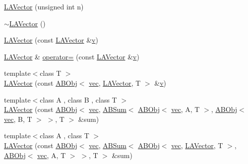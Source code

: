 \begin{DoxyCompactItemize}
\item 
\mbox{\hyperlink{classROOT_1_1Minuit2_1_1LAVector_a3dca313e27f716415056d248bd05cf1f}{L\+A\+Vector}} (unsigned int n)
\item 
\mbox{\hyperlink{classROOT_1_1Minuit2_1_1LAVector_a72c44338e1a37837e9546bfd674c22cb}{$\sim$\+L\+A\+Vector}} ()
\item 
\mbox{\hyperlink{classROOT_1_1Minuit2_1_1LAVector_ad568d638899b4fc3631c3d0a1d76f1cd}{L\+A\+Vector}} (const \mbox{\hyperlink{classROOT_1_1Minuit2_1_1LAVector}{L\+A\+Vector}} \&\mbox{\hyperlink{adat__devel_2lib_2hadron_2hadron__timeslice_8cc_a716fc87f5e814be3ceee2405ed6ff22a}{v}})
\item 
\mbox{\hyperlink{classROOT_1_1Minuit2_1_1LAVector}{L\+A\+Vector}} \& \mbox{\hyperlink{classROOT_1_1Minuit2_1_1LAVector_ad38b5ed9fc32389cb68034cde125b203}{operator=}} (const \mbox{\hyperlink{classROOT_1_1Minuit2_1_1LAVector}{L\+A\+Vector}} \&\mbox{\hyperlink{adat__devel_2lib_2hadron_2hadron__timeslice_8cc_a716fc87f5e814be3ceee2405ed6ff22a}{v}})
\item 
{\footnotesize template$<$class T $>$ }\\\mbox{\hyperlink{classROOT_1_1Minuit2_1_1LAVector_ac38d854f7a156fc61cabce29416f36cc}{L\+A\+Vector}} (const \mbox{\hyperlink{classROOT_1_1Minuit2_1_1ABObj}{A\+B\+Obj}}$<$ \mbox{\hyperlink{classROOT_1_1Minuit2_1_1vec}{vec}}, \mbox{\hyperlink{classROOT_1_1Minuit2_1_1LAVector}{L\+A\+Vector}}, T $>$ \&\mbox{\hyperlink{adat__devel_2lib_2hadron_2hadron__timeslice_8cc_a716fc87f5e814be3ceee2405ed6ff22a}{v}})
\item 
{\footnotesize template$<$class A , class B , class T $>$ }\\\mbox{\hyperlink{classROOT_1_1Minuit2_1_1LAVector_a67f11f13d8b0880924b95b6e90c0005a}{L\+A\+Vector}} (const \mbox{\hyperlink{classROOT_1_1Minuit2_1_1ABObj}{A\+B\+Obj}}$<$ \mbox{\hyperlink{classROOT_1_1Minuit2_1_1vec}{vec}}, \mbox{\hyperlink{classROOT_1_1Minuit2_1_1ABSum}{A\+B\+Sum}}$<$ \mbox{\hyperlink{classROOT_1_1Minuit2_1_1ABObj}{A\+B\+Obj}}$<$ \mbox{\hyperlink{classROOT_1_1Minuit2_1_1vec}{vec}}, A, T $>$, \mbox{\hyperlink{classROOT_1_1Minuit2_1_1ABObj}{A\+B\+Obj}}$<$ \mbox{\hyperlink{classROOT_1_1Minuit2_1_1vec}{vec}}, B, T $>$ $>$, T $>$ \&sum)
\item 
{\footnotesize template$<$class A , class T $>$ }\\\mbox{\hyperlink{classROOT_1_1Minuit2_1_1LAVector_a954c19ce9b70651d06203ca76e59b0da}{L\+A\+Vector}} (const \mbox{\hyperlink{classROOT_1_1Minuit2_1_1ABObj}{A\+B\+Obj}}$<$ \mbox{\hyperlink{classROOT_1_1Minuit2_1_1vec}{vec}}, \mbox{\hyperlink{classROOT_1_1Minuit2_1_1ABSum}{A\+B\+Sum}}$<$ \mbox{\hyperlink{classROOT_1_1Minuit2_1_1ABObj}{A\+B\+Obj}}$<$ \mbox{\hyperlink{classROOT_1_1Minuit2_1_1vec}{vec}}, \mbox{\hyperlink{classROOT_1_1Minuit2_1_1LAVector}{L\+A\+Vector}}, T $>$, \mbox{\hyperlink{classROOT_1_1Minuit2_1_1ABObj}{A\+B\+Obj}}$<$ \mbox{\hyperlink{classROOT_1_1Minuit2_1_1vec}{vec}}, A, T $>$ $>$, T $>$ \&sum)

\end{DoxyCompactItemize}
